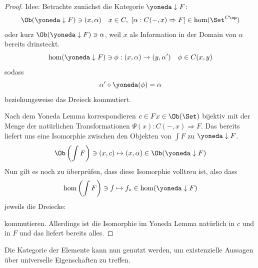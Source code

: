 \documentclass[11pt]{article}
\begin{document}
\begin{proof} Idee: Betrachte zunächst die Kategorie $\yoneda \downarrow F$:
    $$\Ob(\yoneda\downarrow F)\ni (x, \alpha)\quad x\in C, \ [\alpha: C(-,x) \Rightarrow F] \in \hom(\Set^{C\op})$$
    oder kurz $\Ob(\yoneda\downarrow F) \ni \alpha$, weil $x$ als Information in der Domain von $\alpha$ bereits drinsteckt.
    $$ \hom (\yoneda\downarrow F) \ni \phi: (x,\alpha)\to (y, \alpha') \quad \phi \in C(x,y)$$
    sodass
    $$\alpha'\circ \yoneda(\phi) = \alpha $$
    beziehungsweise das Dreieck kommutiert. \bigskip
    
    \begin{figure}[h]
    \centering
    \end{figure}
    
    Nach dem Yoneda Lemma korrespondieren $c\in Fx\in \Ob(\Set)$ bijektiv mit der Menge der natürlichen Transformationen $\Psi(x): C(-,x) \Rightarrow F$. Das bereits liefert uns eine Isomorphie zwischen den Objekten von $\int F$ zu $\yoneda\downarrow F$. 
    $$\Ob\left(\int F\right)\ni (x,c) \mapsto (x, \alpha)\in \Ob(\yoneda \downarrow F)$$
    Nun gilt es noch zu überprüfen, dass diese Isomorphie volltreu ist, also dass 
    $$\hom\left(\int F\right) \ni f\mapsto f_*\in\hom(\yoneda\downarrow F) $$
    jeweils die Dreiecke:
    
       \begin{figure}[h]
    \centering
    \end{figure}
    kommutieren. Allerdings ist die Isomorphie im Yoneda Lemma natürlich in $c$ und in $F$ und das liefert bereits alles.
\end{proof}
Die Kategorie der Elemente kann nun genutzt werden, um existenzielle Aussagen über universelle Eigenschaften zu treffen.
\end{document}
